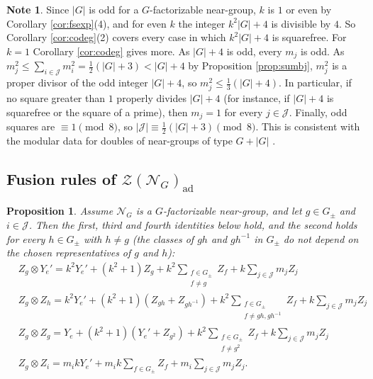 \documentclass[10pt]{article}
\theoremstyle{plain}
\newtheorem{proposition}[theorem]{Proposition}
\theoremstyle{definition}
\newtheorem{note}[theorem]{Note}
\theoremstyle{plain}
\begin{document}
\begin{note}\label{rem:codeg}
Since $|G|$ is odd for a $G$-factorizable near-group, $k$ is $1$ or even by Corollary \ref{cor:fsexp}(4), and for even $k$ the integer $k^2|G|+4$ is divisible by $4$. So Corollary \ref{cor:codeg}(2) covers every case in which $k^2|G|+4$ is squarefree. For $k=1$ Corollary \ref{cor:codeg} gives more. As $|G|+4$ is odd, every $m_j$ is odd. As $m_j^2\leq\sum_{i\in\mathcal{J}}m_i^2=\frac12(|G|+3)<|G|+4$ by Proposition \ref{prop:sumbj}, $m_j^2$ is a proper divisor of the odd integer $|G|+4$, so $m_j^2\leq\frac13(|G|+4)$. In particular, if no square greater than $1$ properly divides $|G|+4$ (for instance, if $|G|+4$ is squarefree or the square of a prime), then $m_j=1$ for every $j\in\mathcal{J}$. Finally, odd squares are $\equiv1\pmod8$, so $|\mathcal{J}|\equiv\frac12(|G|+3)\pmod 8$. This is consistent with the modular data for doubles of near-groups of type $G+|G|$ \cite{MR3167494}.
\end{note}

\subsection{Fusion rules of \texorpdfstring{$\mathcal{Z}(\mathcal{N}_G)_\mathrm{ad}$}{Z(N\_G)-ad}}

\begin{proposition}\label{fus}
Assume $\mathcal{N}_G$ is a $G$-factorizable near-group, and let $g\in G_{\pm}$ and $i\in\mathcal{J}$. Then the first, third and fourth identities below hold, and the second holds for every $h\in G_{\pm}$ with $h\neq g$ (the classes of $gh$ and $gh^{-1}$ in $G_{\pm}$ do not depend on the chosen representatives of $g$ and $h$):
\begin{align}
&Z_g\otimes Y_e'=k^2Y_e'+(k^2+1)Z_g+k^2\sum_{\substack{f\in G_{\pm}\\ f\neq g}}Z_f+k\sum_{j\in\mathcal{J}}m_jZ_j \\
&Z_g\otimes Z_h=k^2Y_e'+(k^2+1)\left(Z_{gh}+Z_{gh^{-1}}\right)+k^2\sum_{\substack{ f\in G_{\pm} \\ f\neq gh,gh^{-1}}}Z_f+k\sum_{j\in\mathcal{J}}m_jZ_j \\
&Z_g\otimes Z_g=Y_e+(k^2+1)(Y_e'+Z_{g^2})+k^2\sum_{\substack{ f\in G_{\pm} \\ f\neq g^2}}Z_f+k\sum_{j\in\mathcal{J}}m_jZ_j \\
&Z_g\otimes Z_i=m_ikY_e'+m_ik\sum_{f\in G_{\pm}}Z_f+m_i\sum_{j\in\mathcal{J}}m_jZ_j.
\end{align}
\end{proposition}
\end{document}

